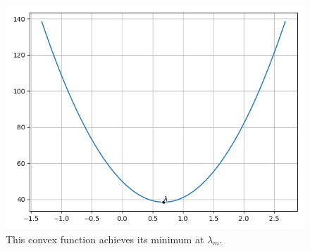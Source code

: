 \documentclass[journal,12pt,twocolumn]{IEEEtran}
\begin{document}
\begin{enumerate}
\begin{figure}[!ht]
        \includegraphics[width=\columnwidth]{figs/convex.png}
        \caption{This convex function achieves its minimum at $\lambda_m$.}
        \label{fig:convex}
    \end{figure}
\end{enumerate}
\end{document}
